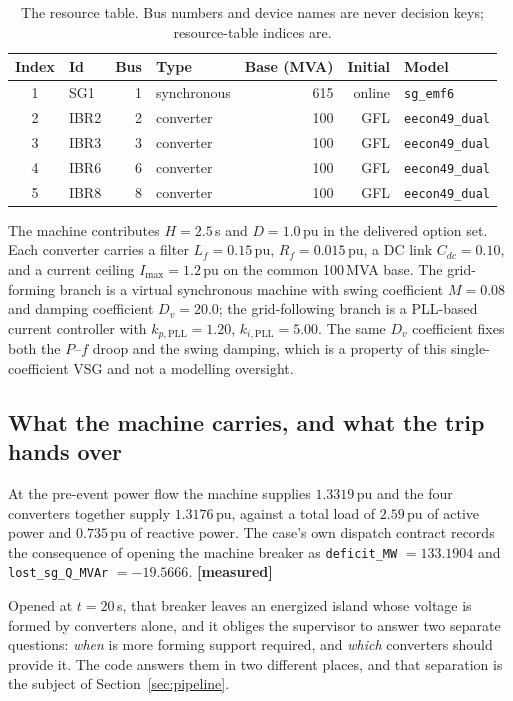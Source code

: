 \documentclass[12pt,a4paper]{article}
\theoremstyle{remark}
\newcommand{\pu}{\,\mathrm{pu}}
\newcommand{\code}[1]{\texttt{\small #1}}
\newcommand{\measured}{\textcolor{ok}{\textbf{[measured]}}}
\begin{document}
\begin{table}[H]
\centering
\small
\begin{tabular}{@{}clrlrrl@{}}
\toprule
\textbf{Index} & \textbf{Id} & \textbf{Bus} & \textbf{Type} & \textbf{Base (MVA)} & \textbf{Initial} & \textbf{Model}\\
\midrule
1 & SG1  & 1 & synchronous & 615 & online & \code{sg\_emf6}\\
2 & IBR2 & 2 & converter   & 100 & GFL    & \code{eecon49\_dual}\\
3 & IBR3 & 3 & converter   & 100 & GFL    & \code{eecon49\_dual}\\
4 & IBR6 & 6 & converter   & 100 & GFL    & \code{eecon49\_dual}\\
5 & IBR8 & 8 & converter   & 100 & GFL    & \code{eecon49\_dual}\\
\bottomrule
\end{tabular}
\caption{The resource table. Bus numbers and device names are never decision
keys; resource-table indices are.}
\end{table}

The machine contributes $H = 2.5$\,s and $D = 1.0\pu$ in the delivered option
set. Each converter carries a filter $L_f = 0.15\pu$, $R_f = 0.015\pu$, a DC
link $C_{dc} = 0.10$, and a current ceiling $I_{\max} = 1.2\pu$ on the common
100\,MVA base. The grid-forming branch is a virtual synchronous machine with
swing coefficient $M = 0.08$ and damping coefficient $D_v = 20.0$; the
grid-following branch is a PLL-based current controller with
$k_{p,\mathrm{PLL}} = 1.20$, $k_{i,\mathrm{PLL}} = 5.00$. The same $D_v$
coefficient fixes both the $P$--$f$ droop and the swing damping, which is a
property of this single-coefficient VSG and not a modelling oversight.

\subsection{What the machine carries, and what the trip hands over}

At the pre-event power flow the machine supplies $1.3319\pu$ and the four
converters together supply $1.3176\pu$, against a total load of $2.59\pu$ of
active power and $0.735\pu$ of reactive power. The case's own dispatch contract
records the consequence of opening the machine breaker as
\code{deficit\_MW} $= 133.1904$ and \code{lost\_sg\_Q\_MVAr} $= -19.5666$.
\measured

Opened at $t = 20$\,s, that breaker leaves an energized island whose voltage is
formed by converters alone, and it obliges the supervisor to answer two separate
questions: \emph{when} is more forming support required, and \emph{which}
converters should provide it. The code answers them in two different places, and
that separation is the subject of Section~\ref{sec:pipeline}.
\end{document}
